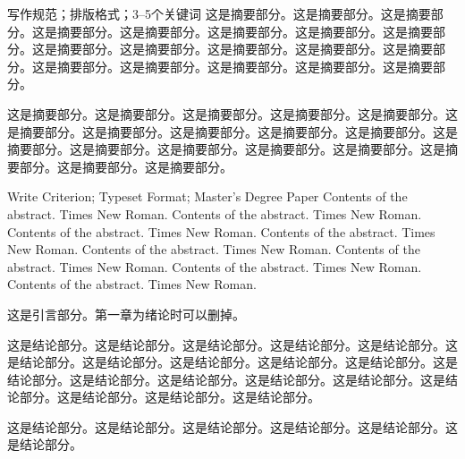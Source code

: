 \documentclass[ecopy,academic]{Style/dutthesis}
\begin{document}

\STMT  %

\begin{Abstract}{写作规范；排版格式；3--5个关键词}  %
    这是摘要部分。这是摘要部分。这是摘要部分。这是摘要部分。这是摘要部分。这是摘要部分。这是摘要部分。这是摘要部分。这是摘要部分。这是摘要部分。这是摘要部分。这是摘要部分。这是摘要部分。这是摘要部分。这是摘要部分。这是摘要部分。这是摘要部分。这是摘要部分。

    这是摘要部分。这是摘要部分。这是摘要部分。这是摘要部分。这是摘要部分。这是摘要部分。这是摘要部分。这是摘要部分。这是摘要部分。这是摘要部分。这是摘要部分。这是摘要部分。这是摘要部分。这是摘要部分。这是摘要部分。这是摘要部分。这是摘要部分。这是摘要部分。
\end{Abstract}

\begin{EngAbstract}{Write Criterion; Typeset Format; Master's Degree Paper}  %
    Contents of the abstract. Times New Roman. Contents of the abstract. Times New Roman. Contents of the abstract. Times New Roman. Contents of the abstract. Times New Roman.
    Contents of the abstract. Times New Roman. Contents of the abstract. Times New Roman. Contents of the abstract. Times New Roman. Contents of the abstract. Times New Roman.
\end{EngAbstract}

\TOC  %

\begin{Introduction}  %
    这是引言部分。第一章为绪论时可以删掉。
\end{Introduction}






\begin{Conclusion}  %
    这是结论部分。这是结论部分。这是结论部分。这是结论部分。这是结论部分。这是结论部分。这是结论部分。这是结论部分。这是结论部分。这是结论部分。这是结论部分。这是结论部分。这是结论部分。这是结论部分。这是结论部分。这是结论部分。这是结论部分。这是结论部分。这是结论部分。

    这是结论部分。这是结论部分。这是结论部分。这是结论部分。这是结论部分。这是结论部分。
\end{Conclusion}
\end{document}
